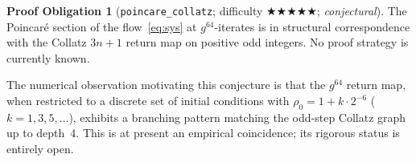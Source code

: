 \documentclass[12pt]{amsart}
\theoremstyle{definition}
\newtheorem{obligation}[theorem]{Proof Obligation}
\theoremstyle{remark}
\newcommand{\lean}[1]{\texttt{#1}}
\begin{document}
\begin{obligation}[\lean{poincare\_collatz};
  difficulty $\bigstar\bigstar\bigstar\bigstar\bigstar$;
  \emph{conjectural}]\label{obl:pcollatz}
The Poincar\'{e} section of the flow~\eqref{eq:sys} at
$g^{64}$-iterates is in structural correspondence with the
Collatz $3n+1$ return map on positive odd integers.
No proof strategy is currently known.
\end{obligation}

The numerical observation motivating this conjecture is that
the $g^{64}$ return map, when restricted to a discrete set of
initial conditions with $\rho_0 = 1 + k\cdot 2^{-6}$
($k=1,3,5,\ldots$), exhibits a branching pattern matching
the odd-step Collatz graph up to depth~4.
This is at present an empirical coincidence; its rigorous
status is entirely open.
\end{document}

